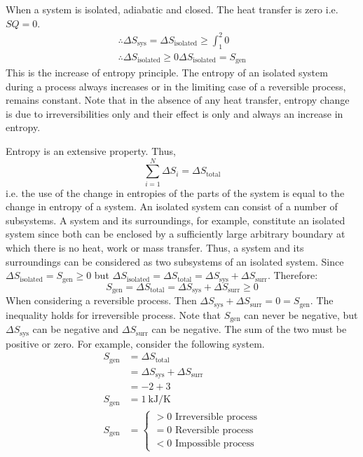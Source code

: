 When a system is isolated, adiabatic and closed. The heat transfer is zero i.e. \(SQ = 0\).
\begin{align}
  \therefore \Delta S_{\textrm{sys}} = \Delta S_{\textrm{isolated}} \geq \int_1^2 0 \\
  \therefore \Delta S_{\textrm{isolated}} \geq 0
  \Delta S_{\textrm{isolated}} = S_{\textrm{gen}}
\end{align}
This is the increase of entropy principle. The entropy of an isolated system during a process always increases or in the limiting case of a reversible process, remains constant. Note that in the absence of any heat transfer, entropy change is due to irreversibilities only and their effect is only and always an increase in entropy.

Entropy is an extensive property. Thus,
\begin{equation}
  \sum^N_{i=1} \Delta S_i = \Delta S_{\textrm{total}}
\end{equation}
i.e. the use of the change in entropies of the parts of the system is equal to the change in entropy of a system. An isolated system can consist of a number of subsystems. A system and its surroundings, for example, constitute an isolated system since both can be enclosed by a sufficiently large arbitrary boundary at which there is no heat, work or mass transfer. Thus, a system and its surroundings can be considered as two subsystems of an isolated system. Since \( \Delta S_{\textrm{isolated}} = S_{\textrm{gen}} \geq 0 \) but \( \Delta S_{\textrm{isolated}} = \Delta S_{\textrm{total}} = \Delta S_{\textrm{sys}} + \Delta S_{\textrm{surr}} \). Therefore:
\begin{equation}
  S_{\textrm{gen}} = \Delta S_{\textrm{total}} = \Delta S_{\textrm{sys}} + \Delta S_{\textrm{surr}} \geq 0
\end{equation}
When considering a reversible process. Then \( \Delta S_{\textrm{sys}} + \Delta S_{\textrm{surr}} = 0 = S_{\textrm{gen}} \). The inequality holds for irreversible process. Note that \( S_{\textrm{gen}}\) can never be negative, but \( \Delta S_{\textrm{sys}} \) can be negative and \( \Delta S_{\textrm{surr}} \) can be negative. The sum of the two must be positive or zero. For example, consider the following system.
\begin{align}
  S_{\textrm{gen}} & = \Delta S_{\textrm{total}}                          \\
                   & = \Delta S_{\textrm{sys}} + \Delta S_{\textrm{surr}} \\
                   & = -2 + 3                                             \\
  S_{\textrm{gen}} & = 1 \ \si{\kilo\joule\per\kelvin}                    \\
  S_{\textrm{gen}} & = \begin{cases}
    > 0 \textrm{ Irreversible process} \\
    = 0 \textrm{ Reversible process}   \\
    < 0 \textrm{ Impossible process}
  \end{cases}
\end{align}
